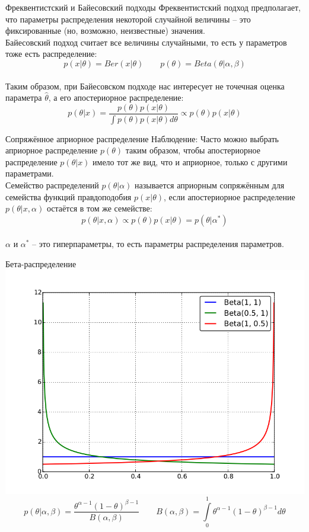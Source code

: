 \documentclass[10pt]{beamer}
\begin{document}
\begin{frame} {Фреквентистский и Байесовский подходы}
  Фреквентистский подход предполагает, что параметры распределения некоторой случайной величины -- это фиксированные (но, возможно, неизвестные) значения.\\
  \pause
  \bigbreak
  Байесовский подход считает все величины случайными, то есть у параметров тоже есть распределение:\\
  $$p(x|\theta) = Ber(x|\theta) \qquad p(\theta) = Beta(\theta|\alpha, \beta)$$\\
  Таким образом, при Байесовском подходе нас интересует не точечная оценка параметра $\hat{\theta}$, а его апостериорное распределение:\\
  \pause
  $$p(\theta|x) = \frac{p(\theta) p(x|\theta)}{\int p(\theta) p(x|\theta) d\theta} \propto p(\theta) p(x|\theta) $$
\end{frame}

\begin{frame}{Сопряжённое априорное распределение}
  \alert{Наблюдение}: Часто можно выбрать априорное распределение $p(\theta)$ таким образом, чтобы апостериорное распределение $p(\theta|x)$ имело тот же вид, что и априорное, только с другими параметрами.\\
  \bigbreak
  \pause
  Семейство распределений $p(\theta|\alpha)$ называется априорным сопряжённым для семейства функций правдоподобия $p(x|\theta)$, если апостериорное распределение $p(\theta|x, \alpha)$ остаётся в том же семействе:\\
  $$p(\theta|x, \alpha) \propto p(\theta) p(x|\theta)  = p(\theta|\alpha^*)$$\\
  \bigbreak
  $\alpha$ и $\alpha^*$ -- это \alert{гипер}параметры, то есть параметры распределения параметров.
\end{frame}

\begin{frame}{Бета-распределение}
  \centering
  \includegraphics[width=0.7 \textwidth, keepaspectratio]{images/Beta}
  $$p(\theta|\alpha, \beta) = \frac{\theta^{\alpha-1} (1-\theta)^{\beta-1}}{B(\alpha, \beta)} \qquad B(\alpha, \beta) = \int\limits_0^1 \theta^{\alpha-1} (1-\theta)^{\beta-1} d\theta$$
\end{frame}
\end{document}
